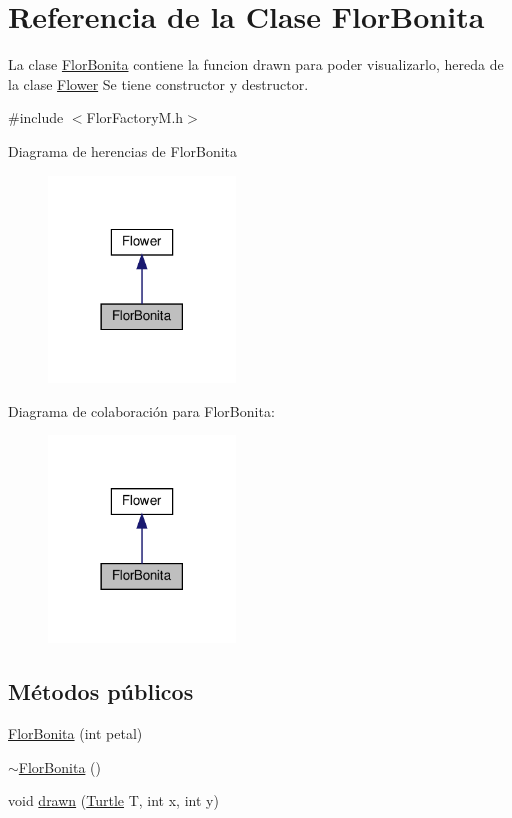 \hypertarget{classFlorBonita}{}\section{Referencia de la Clase Flor\+Bonita}
\label{classFlorBonita}


La clase \hyperlink{classFlorBonita}{Flor\+Bonita} contiene la funcion drawn para poder visualizarlo, hereda de la clase \hyperlink{classFlower}{Flower}  Se tiene constructor y destructor.  




{\ttfamily \#include $<$Flor\+Factory\+M.\+h$>$}



Diagrama de herencias de Flor\+Bonita\nopagebreak
\begin{figure}[H]
\begin{center}
\leavevmode
\includegraphics[width=141pt]{classFlorBonita__inherit__graph}
\end{center}
\end{figure}


Diagrama de colaboración para Flor\+Bonita\+:\nopagebreak
\begin{figure}[H]
\begin{center}
\leavevmode
\includegraphics[width=141pt]{classFlorBonita__coll__graph}
\end{center}
\end{figure}
\subsection*{Métodos públicos}
\begin{DoxyCompactItemize}
\item 
\hyperlink{classFlorBonita_afccba3e47c8f7ad9e6da420aeba9769f}{Flor\+Bonita} (int petal)
\item 
\hyperlink{classFlorBonita_ada709e8050834cb8d988b5ba1bc558dc}{$\sim$\+Flor\+Bonita} ()
\item 
void \hyperlink{classFlorBonita_a028f32ccf00bb677f54349afa49657e4}{drawn} (\hyperlink{classTurtle}{Turtle} T, int x, int y)
\end{DoxyCompactItemize}
